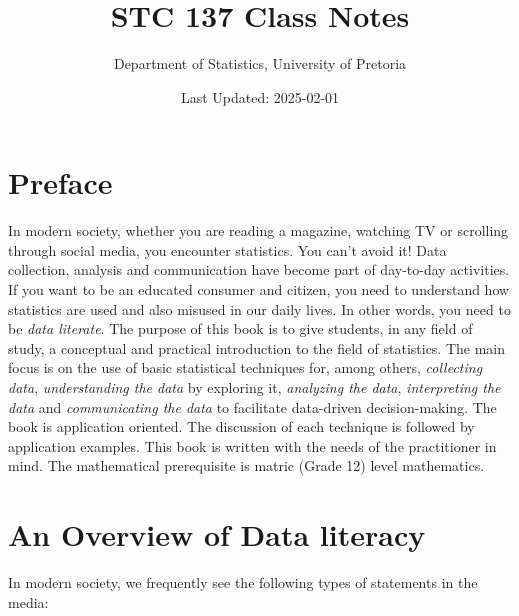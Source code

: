 \documentclass[
]{book}
\title{STC 137 Class Notes}
\author{Department of Statistics, University of Pretoria}
\date{Last Updated: 2025-02-01}
\begin{document}
\maketitle

{
\setcounter{tocdepth}{2}
\tableofcontents
}
\chapter*{Preface}\label{preface}

In modern society, whether you are reading a magazine, watching TV or scrolling through social media, you encounter statistics. You can't avoid it! Data collection, analysis and communication have become part of day-to-day activities. If you want to be an educated consumer and citizen, you need to understand how statistics are used and also misused in our daily lives. In other words, you need to be \emph{data literate}. The purpose of this book is to give students, in any field of study, a conceptual and practical introduction to the field of statistics. The main focus is on the use of basic statistical techniques for, among others, \emph{collecting data}, \emph{understanding the data} by exploring it, \emph{analyzing the data}, \emph{interpreting the data} and \emph{communicating the data} to facilitate data-driven decision-making. The book is application oriented. The discussion of each technique is followed by application examples. This book is written with the needs of the practitioner in mind. The mathematical prerequisite is matric (Grade 12) level mathematics.

\chapter{An Overview of Data literacy}\label{an-overview-of-data-literacy}

In modern society, we frequently see the following types of statements in the media:
\end{document}
